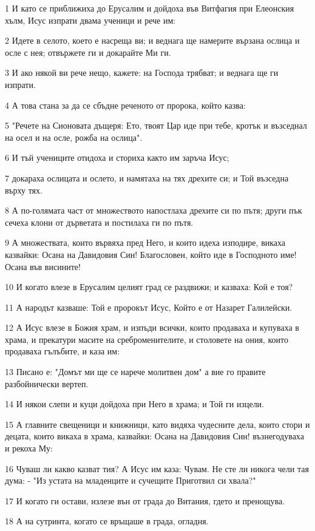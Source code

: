 \par 1 И като се приближиха до Ерусалим и дойдоха във Витфагия при Елеонския хълм, Исус изпрати двама ученици и рече им:
\par 2 Идете в селото, което е насреща ви; и веднага ще намерите вързана ослица и осле с нея; отвържете ги и докарайте Ми ги.
\par 3 И ако някой ви рече нещо, кажете: на Господа трябват; и веднага ще ги изпрати.
\par 4 А това стана за да се сбъдне реченото от пророка, който казва:
\par 5 "Речете на Сионовата дъщеря: Ето, твоят Цар иде при тебе, кротък и възседнал на осел и на осле, рожба на ослица".
\par 6 И тъй учениците отидоха и сториха както им заръча Исус;
\par 7 докараха ослицата и ослето, и намятаха на тях дрехите си; и Той възседна върху тях.
\par 8 А по-голямата част от множеството напостлаха дрехите си по пътя; други пък сечеха клони от дърветата и постилаха ги по пътя.
\par 9 А множествата, които вървяха пред Него, и които идеха изподире, викаха казвайки: Осана на Давидовия Син! Благословен, който иде в Господното име! Осана във висините!
\par 10 И когато влезе в Ерусалим целият град се раздвижи; и казваха: Кой е тоя?
\par 11 А народът казваше: Той е пророкът Исус, Който е от Назарет Галилейски.
\par 12 А Исус влезе в Божия храм, и изпъди всички, които продаваха и купуваха в храма, и прекатури масите на среброменителите, и столовете на ония, които продаваха гълъбите, и каза им:
\par 13 Писано е: "Домът ми ще се нарече молитвен дом" а вие го правите разбойнически вертеп.
\par 14 И някои слепи и куци дойдоха при Него в храма; и Той ги изцели.
\par 15 А главните свещеници и книжници, като видяха чудесните дела, които стори и децата, които викаха в храма, казвайки: Осана на Давидовия Син! възнегодуваха и рекоха Му:
\par 16 Чуваш ли какво казват тия? А Исус им каза: Чувам. Не сте ли никога чели тая дума: - "Из устата на младенците и сучещите Приготвил си хвала?"
\par 17 И когато ги остави, излезе вън от града до Витания, гдето и пренощува.
\par 18 А на сутринта, когато се връщаше в града, огладня.
